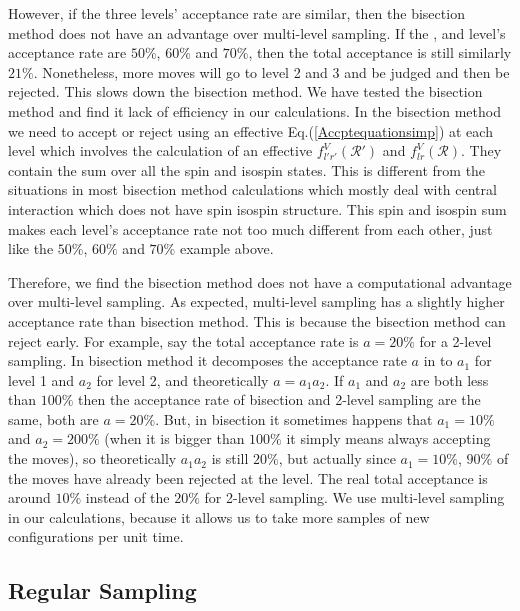 \documentclass[12pt,letterpaper,UTF8]{report}
\begin{document}
However, if the three levels' acceptance rate are similar,
then the bisection method does not have an advantage over multi-level sampling.
If the ,  and  level's acceptance rate are $50\%$, $60\%$ and $70\%$, then the total acceptance is still similarly $21\%$.
Nonetheless, more moves will go to level 2 and 3 and be judged and then be rejected.
This slows down the bisection method.
We have tested the bisection method and find it lack of efficiency in our calculations.
In the bisection method we need to accept or reject using an effective Eq.(\ref{Accptequationsimp}) at each level which involves the calculation of an effective $f^V_{l'r'}(\mathcal{R}')$ and $f^V_{lr}(\mathcal{R})$.
They contain the sum over all the spin and isospin states.
This is different from the situations in most bisection method calculations which mostly deal with central interaction which does not have spin isospin structure.
This spin and isospin sum makes each level's acceptance rate not too much different from each other, just like the $50\%$, $60\%$ and $70\%$ example above.

Therefore, we find the bisection method does not have a computational advantage over multi-level sampling.
As expected, multi-level sampling has a slightly higher acceptance rate than bisection method.
This is because the bisection method can reject early.
For example, say the total acceptance rate is $a=20\%$ for a 2-level sampling. In bisection method it decomposes the acceptance rate $a$ in to $a_1$ for level 1 and $a_2$ for level 2, and theoretically $a=a_1a_2$.
If $a_1$ and $a_2$ are both less than $100\%$ then the acceptance rate of bisection and 2-level sampling are the same, both are $a=20\%$.
But, in bisection it sometimes happens that $a_1=10\%$ and $a_2=200\%$
(when it is bigger than $100\%$ it simply means always accepting the moves),
so theoretically $a_1a_2$ is still $20\%$, but actually since $a_1=10\%$, $90\%$ of the moves have already been rejected at the  level.
The real total acceptance is around $10\%$ instead of the $20\%$ for 2-level sampling.
We use multi-level sampling in our calculations, because it allows us to take more samples of new configurations per unit time.



\subsection{Regular Sampling}
\label{secregularsampling}
\end{document}
